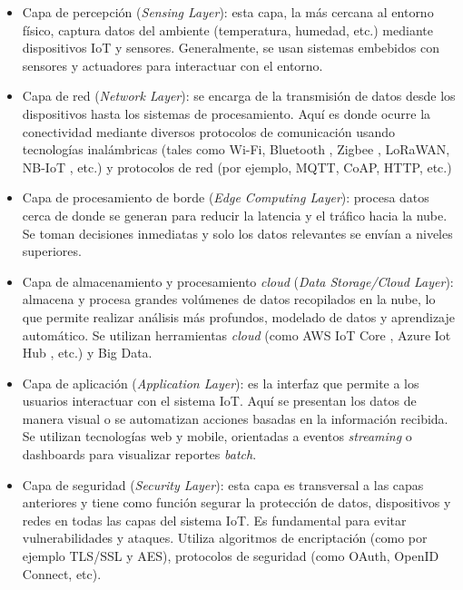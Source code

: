 \begin{itemize}

	\item Capa de percepción (\textit{Sensing Layer}): esta capa, la más cercana al entorno físico, captura datos del ambiente (temperatura, humedad, etc.) mediante dispositivos IoT y sensores. Generalmente, se usan sistemas embebidos con sensores y actuadores para interactuar con el entorno.
	
	\item Capa de red (\textit{Network Layer}): se encarga de la transmisión de datos desde los dispositivos hasta los sistemas de procesamiento. Aquí es donde ocurre la conectividad mediante diversos protocolos de comunicación usando tecnologías inalámbricas (tales como Wi-Fi, Bluetooth \citep{Bluetooth}, Zigbee \citep{zigbee}, LoRaWAN, NB-IoT \citep{Narrowband_IoT}, etc.) y protocolos de red (por ejemplo, MQTT, CoAP, HTTP, etc.)
	
	\item Capa de procesamiento de borde (\textit{Edge Computing Layer}): procesa datos cerca de donde se generan para reducir la latencia y el tráfico hacia la nube. Se toman decisiones inmediatas y solo los datos relevantes se envían a niveles superiores. 
	
	\item Capa de almacenamiento y procesamiento \textit{cloud} (\textit{Data Storage/Cloud Layer}): almacena y procesa grandes volúmenes de datos recopilados en la nube, lo que permite realizar análisis más profundos, modelado de datos y aprendizaje automático. Se utilizan herramientas \textit{cloud} (como AWS IoT Core \citep{aws_iot_core}, Azure Iot Hub \citep{azure_iot}, etc.) y Big Data.
	
	\item Capa de aplicación (\textit{Application Layer}): es la interfaz que permite a los usuarios interactuar con el sistema IoT. Aquí se presentan los datos de manera visual o se automatizan acciones basadas en la información recibida. Se utilizan tecnologías web y mobile, orientadas a eventos \textit{streaming} o dashboards para visualizar reportes \textit{batch}.
	
	\item Capa de seguridad (\textit{Security Layer}): esta capa es transversal a las capas anteriores y tiene como función segurar la protección de datos, dispositivos y redes en todas las capas del sistema IoT. Es fundamental para evitar vulnerabilidades y ataques. Utiliza algoritmos de encriptación (como por ejemplo TLS/SSL y AES), protocolos de seguridad (como OAuth, OpenID Connect, etc).
	
\end{itemize}


